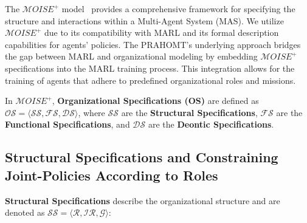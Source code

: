 \documentclass[runningheads]{llncs}
\theoremstyle{freethm}
\theoremstyle{proofoutline}
\begin{document}
The $\mathcal{M}OISE^+$ model~\cite{Hubner2007} provides a comprehensive framework for specifying the structure and interactions within a Multi-Agent System (MAS). We utilize $\mathcal{M}OISE^+$ due to its compatibility with MARL and its formal description capabilities for agents' policies. The PRAHOMT's underlying approach bridges the gap between MARL and organizational modeling by embedding $\mathcal{M}OISE^+$ specifications into the MARL training process. This integration allows for the training of agents that adhere to predefined organizational roles and missions.

In $\mathcal{M}OISE^+$, \textbf{Organizational Specifications (OS)} are defined as $\mathcal{OS} = \langle \mathcal{SS}, \mathcal{FS}, \mathcal{DS} \rangle$, where $\mathcal{SS}$ are the \textbf{Structural Specifications}, $\mathcal{FS}$ are the \textbf{Functional Specifications}, and $\mathcal{DS}$ are the \textbf{Deontic Specifications}.

\subsection{Structural Specifications and Constraining Joint-Policies According to Roles}

\textbf{Structural Specifications} describe the organizational structure and are denoted as $\mathcal{SS} = \langle \mathcal{R}, \mathcal{IR}, \mathcal{G} \rangle$:
\end{document}
